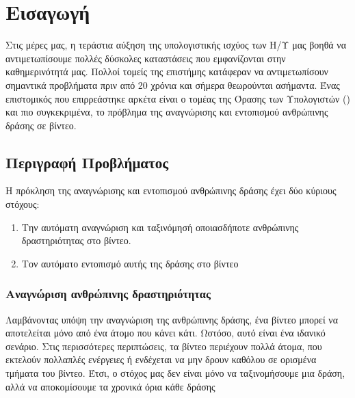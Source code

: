 



% 

\chapter{Εισαγωγή}
Στις μέρες μας, η τεράστια αύξηση της υπολογιστικής ισχύος των Η/Υ μας βοηθά να αντιμετωπίσουμε πολλές δύσκολες καταστάσεις που εμφανίζονται στην καθημερινότητά μας.
Πολλοί τομείς της επιστήμης κατάφεραν να αντιμετωπίσουν σημαντικά προβλήματα πριν από 20 χρόνια και σήμερα θεωρούνται ασήμαντα. Ένας επιστομικός που επιρρεάστηκε
αρκέτα είναι ο τομέας της Όρασης των Υπολογιστών () και πιο συγκεκριμένα, το πρόβλημα της αναγνώρισης και  εντοπισμού ανθρώπινης δράσης σε βίντεο.
\section{Περιγραφή Προβλήματος}
H πρόκληση της αναγνώρισης και εντοπισμού ανθρώπινης δράσης έχει δύο κύριους στόχους:
\begin{enumerate}
\item Την αυτόματη αναγνώριση και ταξινόμησή οποιασδήποτε ανθρώπινης δραστηριότητας στο βίντεο.
\item Τον αυτόματο εντοπισμό αυτής της δράσης στο βίντεο
\end{enumerate}


\subsection{Αναγνώριση ανθρώπινης δραστηριότητας}
Λαμβάνοντας υπόψη την αναγνώριση της ανθρώπινης δράσης, ένα βίντεο μπορεί να αποτελείται μόνο από ένα άτομο που κάνει κάτι. Ωστόσο, αυτό είναι ένα ιδανικό
σενάριο. Στις περισσότερες περιπτώσεις, τα βίντεο περιέχουν πολλά άτομα, που εκτελούν πολλαπλές ενέργειες ή ενδέχεται να μην δρουν καθόλου σε ορισμένα τμήματα
του βίντεο.
Έτσι, ο στόχος μας δεν είναι μόνο να ταξινομήσουμε μια δράση, αλλά να αποκομίσουμε τα χρονικά όρια κάθε δράσης


